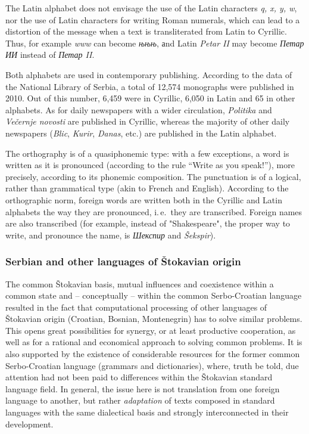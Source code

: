 \begin{multicols}{2}
The Latin alphabet does not envisage the use of the Latin characters \textit{q, x, y, w}, nor the use of Latin characters for writing Roman numerals, which can lead to a distortion of the message when a text is transliterated from Latin to Cyrillic.  Thus, for 
example \textit{www} can become \textit{њњњ}, аnd Latin \textit{Petar II} may become \textit{Петар ИИ} instead of \textit{Петар II}. 

Both alphabets are used in contemporary publishing. According to the data of the National Library of Serbia, a total of 12,574  monographs were published in 2010. Out of this number, 6,459 were in Cyrillic, 6,050 in Latin and 65 in other alphabets. As for daily newspapers with a wider circulation, \textit{Politika} and \textit{Večernje novosti} are published in Cyrillic, whereas the majority of other daily newspapers (\textit{Blic}, \textit{Kurir}, \textit{Danas}, etc.) are published in the Latin alphabet. 

The orthography is of a quasiphonemic type: with a few exceptions, a word is written as it is pronounced (according to the rule “Write as you speak!”), more precisely, according to its phonemic composition. 
The punctuation is of a logical, rather than grammatical type (akin to French and English).
According to the orthographic norm, foreign words are written both in the Cyrillic and Latin alphabets the way they are pronounced, i.\,e.~they are transcribed. Foreign names are also transcribed (for example, instead of "Shakespeare", the proper way to write, and pronounce the name, is \textit{Шекспир} and \textit{Šekspir}).

\subsubsection {Serbian and other languages of Štokavian origin}

The common Štokavian basis, mutual influences and coexistence within a common state and – conceptually – within the common Serbo-Croatian language resulted in the fact that computational processing of other languages of Štokavian origin (Croatian, Bosnian, Montenegrin) has to solve similar problems. This opens great possibilities for synergy, or at least productive cooperation, as well as for a rational and economical approach to solving common problems. It is also supported by the existence of considerable resources for the former common Serbo-Croatian language (grammars and dictionaries), where, truth be told, due attention had not been paid to differences within the Štokavian standard language field. In general, the issue here is not translation from one foreign language to another, but rather \textit{adaptation} of texts composed in standard languages with the same dialectical basis and strongly interconnected in their development. 


\end{multicols}
